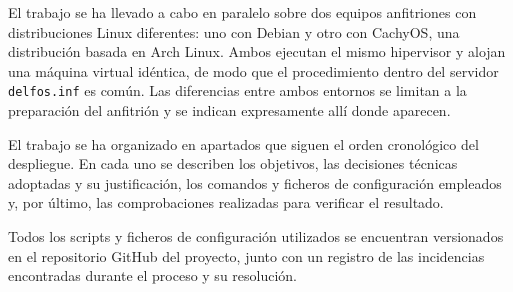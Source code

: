 \documentclass[11pt,a4paper]{article}
\begin{document}
El trabajo se ha llevado a cabo en paralelo sobre dos equipos anfitriones con distribuciones Linux diferentes: uno con Debian y otro con CachyOS, una distribución basada en Arch Linux. Ambos ejecutan el mismo hipervisor y alojan una máquina virtual idéntica, de modo que el procedimiento dentro del servidor \texttt{delfos.inf} es común. Las diferencias entre ambos entornos se limitan a la preparación del anfitrión y se indican expresamente allí donde aparecen.

El trabajo se ha organizado en apartados que siguen el orden cronológico del despliegue. En cada uno se describen los objetivos, las decisiones técnicas adoptadas y su justificación, los comandos y ficheros de configuración empleados y, por último, las comprobaciones realizadas para verificar el resultado.

Todos los scripts y ficheros de configuración utilizados se encuentran versionados en el repositorio GitHub del proyecto, junto con un registro de las incidencias encontradas durante el proceso y su resolución.

\newpage







\end{document}

